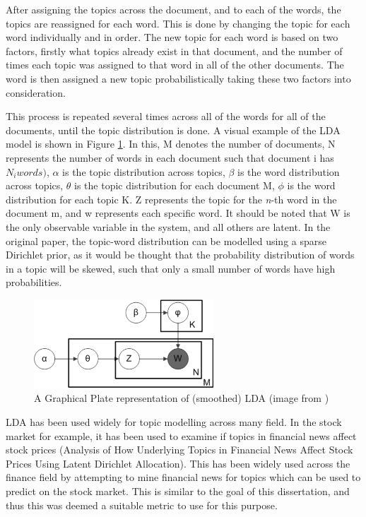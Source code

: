\noindent After assigning the topics across the document, and to each of the words, the topics are reassigned for each word. This is done by changing the topic for each word individually and in order. The new topic for each word is based on two factors, firstly what topics already exist in that document, and the number of times each topic was assigned to that word in all of the other documents. The word is then assigned a new topic probabilistically taking these two factors into consideration.

\noindent This process is repeated several times across all of the words for all of the documents, until the topic distribution is done. A visual example of the LDA model is shown in Figure \ref{fig:ldafigure}. In this, M denotes the number of documents,
N represents the number of words in each document such that document i has $N_{i} words)$, $\alpha$ is the topic distribution across topics, $\beta$ is the word distribution across topics, $\theta$ is the topic distribution for each document M, $\phi$ is the word distribution for each topic K. Z represents the topic for the \textit{n}-th word in the document m, and w represents each specific word. It should be noted that W is the only observable variable in the system, and all others are latent. In the original paper, the topic-word distribution can be modelled using a sparse Dirichlet prior, as it would be thought that the probability distribution of words in a topic will be skewed, such that only a small number of words have high probabilities. 

\begin{figure}
	\centering
		\includegraphics[width=0.6\textwidth]{images/LDA.png}
	\caption{A Graphical Plate representation of (smoothed) LDA (image from \cite{LDA})}
	\label{fig:ldafigure}
\end{figure}


LDA has been used widely for topic modelling across many field. In the stock market for example, it has been used to examine if topics in financial news affect stock prices (Analysis of How Underlying Topics in Financial News Affect Stock Prices Using Latent Dirichlet Allocation). This has been widely used across the finance field by attempting to mine financial news for topics which can be used to predict on the stock market. This is similar to the goal of this dissertation, and thus this was deemed a suitable metric to use for this purpose. 
 
